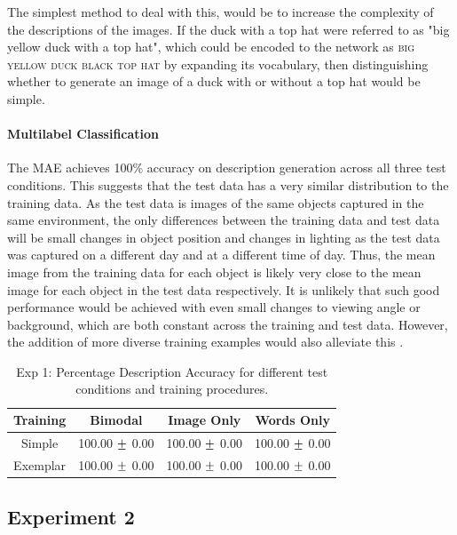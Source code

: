 The simplest method to deal with this, would be to increase the complexity of the descriptions of the images. If the duck with a top hat were referred to as "big yellow duck with a top hat", which could be encoded to the network as \textsc{big yellow duck black top hat} by expanding its vocabulary, then distinguishing whether to generate an image of a duck with or without a top hat would be simple.


\paragraph{Multilabel Classification}

The \ac{MAE} achieves 100\% accuracy on description generation across all three test conditions. This suggests that the test data has a very similar distribution to the training data. As the test data is images of the same objects captured in the same environment, the only differences between the training data and test data will be small changes in object position and  changes in lighting as the test data was captured on a different day and at a different time of day. Thus, the mean image from the training data for each object is likely very close to the mean image for each object in the test data respectively. It is unlikely that such good performance would be achieved with even small changes to viewing angle or background, which are both constant across the training and test data. However, the addition of more diverse training examples would also alleviate this \cite{keller2016analysis, keller}.


\begin{table}[h!]
\centering
	\begin{tabular}{|c|c|c|c|}
	\hline
\textbf{Training }	 & 	\textbf{Bimodal} & \textbf{Image Only} 	& 	\textbf{Words Only} \\ \hline
Simple & 100.00 $\mypm$ 0.00 & 100.00 $\mypm$ 0.00 & 100.00 $\mypm$ 0.00 \\ \hline
Exemplar & 100.00 $\mypm$ 0.00 & 100.00 $\mypm$ 0.00 & 100.00 $\mypm$ 0.00 \\ \hline
	\end{tabular}
\caption{Exp 1: Percentage Description Accuracy for different test conditions and training procedures.}
\label{tab:6_res_exp1_acc}
\end{table}

\newpage
\subsection{Experiment 2}

